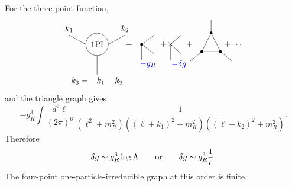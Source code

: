 For the three-point function,
\[
\begin{tikzpicture}[baseline=(eq.base),scale=.88]
  \coordinate (eq) at (0,0);
  \node[draw,circle,minimum size=.95cm] (ipi) at (-3.5,0) {1PI};
  \draw (ipi.west)--++(-.8,.45) node[above] {\(k_1\)};
  \draw (ipi.east)--++(.8,.45) node[above] {\(k_2\)};
  \draw (ipi.south)--++(0,-.9) node[below] {\(k_3=-k_1-k_2\)};
  \node at (-1.95,0) {\(=\)};
  \draw (-1.35,0)--(-.75,.45);
  \draw (-1.35,0)--(-.75,-.45);
  \draw (-1.35,0)--(-1.35,-.75);
  \fill (-1.35,0) circle (2pt);
  \node[blue] at (-1.05,-.95) {\(-g_R\)};
  \node at (-.3,0) {\(+\)};
  \draw (.05,0)--(.55,.45);
  \draw (.05,0)--(.55,-.45);
  \draw (.05,0)--(.05,-.75);
  \node at (.05,0) {\(\times\)};
  \node[blue] at (.45,-.95) {\(-\delta g\)};
  \node at (.95,0) {\(+\)};
  \coordinate (a) at (1.55,-.35);
  \coordinate (b) at (2.45,-.35);
  \coordinate (c) at (2.0,.55);
  \draw (a)--(b)--(c)--cycle;
  \draw (a)--++(-.55,-.45);
  \draw (b)--++(.55,-.45);
  \draw (c)--++(0,.65);
  \fill (a) circle (2pt);
  \fill (b) circle (2pt);
  \fill (c) circle (2pt);
  \node at (3.05,0) {\(+\cdots\)};
\end{tikzpicture}
\]
and the triangle graph gives
\[
  -g_R^3
  \int\frac{d^6\ell}{(2\pi)^6}\,
  \frac{1}{
    (\ell^2+m_R^2)
    ((\ell+k_1)^2+m_R^2)
    ((\ell+k_2)^2+m_R^2)
  } .
\]
Therefore
\[
  \delta g\sim g_R^3\log\Lambda
  \qquad\hbox{or}\qquad
  \delta g\sim g_R^3\frac{1}{\epsilon}.
\]
The four-point one-particle-irreducible graph at this order is finite.

